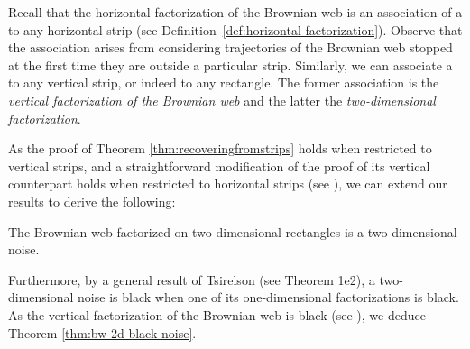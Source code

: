 {
Recall that the horizontal factorization of the Brownian web is an
association of a \sigfield{} to any horizontal strip (see
Definition~\ref{def:horizontal-factorization}).
Observe that the association arises from considering trajectories of the Brownian
web stopped at the first time they are outside a particular strip.
Similarly, we can
associate a \sigfield{} to any vertical strip, or indeed to any rectangle.
The former association is the \emph{vertical factorization of the Brownian web}
and the latter the \emph{two-dimensional factorization}.

As the proof of Theorem \ref{thm:recoveringfromstrips}
holds when restricted to vertical strips, and a straightforward
modification of the proof of its vertical
counterpart holds when restricted to horizontal strips
(see \cite{tsirelson-scaling-limit-noise-stability}),
we can extend our results to derive the following:

\begin{proposition*}
The Brownian web factorized on two-dimensional
rectangles is a two-dimensional noise.
\end{proposition*}

Furthermore, by a general result
of Tsirelson (see
\cite{tsirelson-noise-as-a-boolean-algebra} Theorem 1e2),
a two-dimensional noise is black when
one of its one-dimensional factorizations is
black. As the vertical factorization of
the Brownian web is black (see
\cite{tsirelson-nonclassical-stochastic-flows}),
we deduce Theorem \ref{thm:bw-2d-black-noise}.
}
